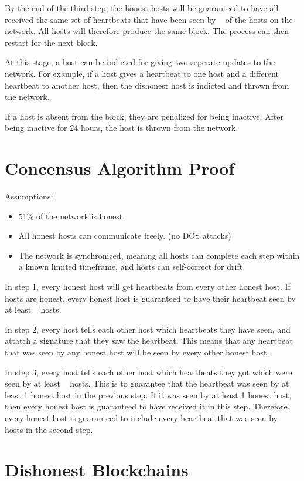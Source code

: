 \documentclass[twocolumn]{article}
\begin{document}
By the end of the third step, the honest hosts will be guaranteed to have all received the same set of heartbeats that have been seen by \fiftyone ~ of the hosts on the network.
All hosts will therefore produce the same block.
The process can then restart for the next block.

At this stage, a host can be indicted for giving two seperate updates to the network.
For example, if a host gives a heartbeat to one host and a different heartbeat to another host, then the dishonest host is indicted and thrown from the network.

If a host is absent from the block, they are penalized for being inactive.
After being inactive for 24 hours, the host is thrown from the network.

\section{Concensus Algorithm Proof}

Assumptions:
\begin{itemize}
	\item 51\% of the network is honest.
	\item All honest hosts can communicate freely. (no DOS attacks)
	\item The network is synchronized, meaning all hosts can complete each step within a known limited timeframe, and hosts can self-correct for drift
\end{itemize}

In step 1, every honest host will get heartbeats from every other honest host.
If \fiftyone ~ hosts are honest, every honest host is guaranteed to have their heartbeat seen by at least \fiftyone ~ hosts.

In step 2, every host tells each other host which heartbeats they have seen, and attatch a signature that they saw the heartbeat.
This means that any heartbeat that was seen by any honest host will be seen by every other honest host.

In step 3, every host tells each other host which heartbeats they got which were seen by at least \fiftyone ~ hosts.
This is to guarantee that the heartbeat was seen by at least 1 honest host in the previous step.
If it was seen by at least 1 honest host, then every honest host is guaranteed to have received it in this step.
Therefore, every honest host is guaranteed to include every heartbeat that was seen by \fiftyone ~ hosts in the second step.

\section{Dishonest Blockchains}
\end{document}
